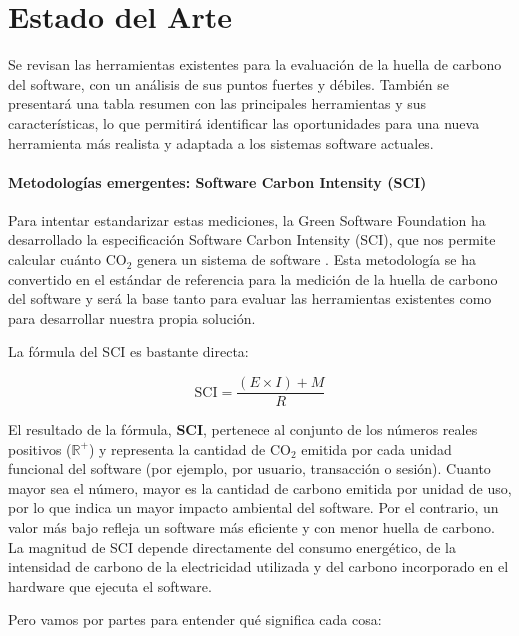 \documentclass[12pt,a4paper]{report}
\begin{document}
\chapter{Estado del Arte}

Se revisan las herramientas existentes para la evaluación de la huella de
carbono del software, con un análisis de sus puntos fuertes y débiles. También
se presentará una tabla resumen con las principales herramientas y sus
características, lo que permitirá identificar las oportunidades para una nueva
herramienta más realista y adaptada a los sistemas software actuales.

\subsubsection{Metodologías emergentes: Software Carbon Intensity (SCI)}

Para intentar estandarizar estas mediciones, la Green Software Foundation ha desarrollado la especificación Software Carbon Intensity (SCI), que nos permite calcular cuánto CO$_2$ genera un sistema de software \cite{ref5}. Esta metodología se ha convertido en el estándar de referencia para la medición de la huella de carbono del software y será la base tanto para evaluar las herramientas existentes como para desarrollar nuestra propia solución.

La fórmula del SCI es bastante directa:

\begin{equation}
  \text{SCI} = \frac{(E \times I) + M}{R}
\end{equation}

El resultado de la fórmula, \textbf{SCI}, pertenece al conjunto de los números reales positivos ($\mathbb{R}^{+}$) y representa la cantidad de CO$_2$ emitida por cada unidad funcional del software (por ejemplo, por usuario, transacción o sesión). Cuanto mayor sea el número, mayor es la cantidad de carbono emitida por unidad de uso, por lo que indica un mayor impacto ambiental del software. Por el contrario, un valor más bajo refleja un software más eficiente y con menor huella de carbono. La magnitud de SCI depende directamente del consumo energético, de la intensidad de carbono de la electricidad utilizada y del carbono incorporado en el hardware que ejecuta el software.

Pero vamos por partes para entender qué significa cada cosa:
\end{document}
